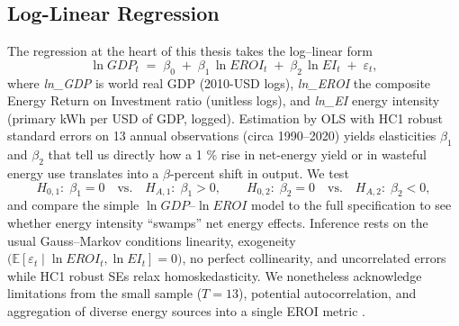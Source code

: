 \documentclass[a4paper,12pt]{article}
\begin{document}
\subsection{Log-Linear Regression}
The regression at the heart of this thesis takes the log–linear form
\[
    \ln GDP_{t}
    \;=\;
    \beta_{0}
    \;+\;
    \beta_{1}\,\ln EROI_{t}
    \;+\;
    \beta_{2}\,\ln EI_{t}
    \;+\;
    \varepsilon_{t},
\]
where \emph{ln\_GDP} is world real GDP (2010-USD logs), \emph{ln\_EROI} the composite
Energy Return on Investment ratio (unitless logs), and \emph{ln\_EI} energy intensity (primary kWh per USD of GDP, logged). Estimation by OLS with HC1 robust standard errors on 13 annual observations (circa 1990–2020) yields elasticities $\beta_{1}$ and $\beta_{2}$ that tell us directly how a 1 \% rise in net-energy yield or in wasteful energy use translates into a $\beta$-percent shift in output. We test
\[
    H_{0,1}\!: \;\beta_{1}=0
    \quad\text{vs.}\quad
    H_{A,1}\!: \;\beta_{1}>0,
    \qquad
    H_{0,2}\!: \;\beta_{2}=0
    \quad\text{vs.}\quad
    H_{A,2}\!: \;\beta_{2}<0,
\]
and compare the simple $\ln GDP$–$\ln EROI$ model to the full specification to see whether energy intensity “swamps” net energy effects.  Inference rests on the usual Gauss–Markov conditions linearity, exogeneity $\bigl(\mathbb{E}[\varepsilon_{t}\mid\ln EROI_{t},\ln EI_{t}] = 0\bigr)$, no perfect collinearity, and uncorrelated errors while HC1 robust SEs relax homoskedasticity. We nonetheless acknowledge limitations from the small sample ($T=13$), potential autocorrelation, and aggregation of diverse energy sources into a single EROI metric
.
\end{document}
